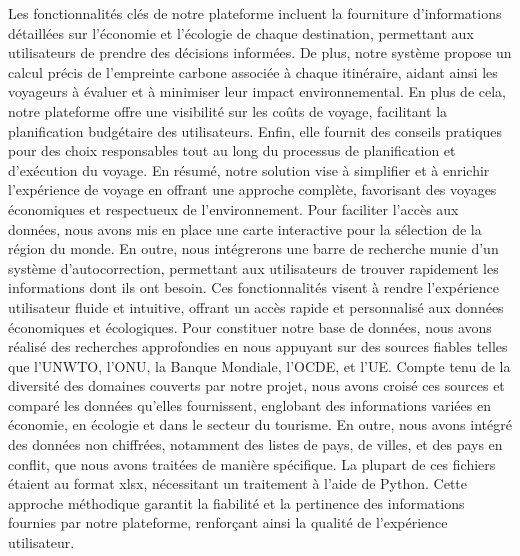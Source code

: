 \documentclass[mstat,12pt]{unswthesis}
\begin{document}
\begin{adjustwidth}{-2cm}{}
Les fonctionnalités clés de notre plateforme incluent la fourniture
d'informations détaillées sur l'économie et l'écologie de chaque
destination, permettant aux utilisateurs de prendre des décisions
informées. De plus, notre système propose un calcul précis de
l'empreinte carbone associée à chaque itinéraire, aidant ainsi les
voyageurs à évaluer et à minimiser leur impact environnemental. En plus
de cela, notre plateforme offre une visibilité sur les coûts de voyage,
facilitant la planification budgétaire des utilisateurs. Enfin, elle
fournit des conseils pratiques pour des choix responsables tout au long
du processus de planification et d'exécution du voyage. En résumé, notre
solution vise à simplifier et à enrichir l'expérience de voyage en
offrant une approche complète, favorisant des voyages économiques et
respectueux de l'environnement. Pour faciliter l'accès aux données, nous
avons mis en place une carte interactive pour la sélection de la région
du monde. En outre, nous intégrerons une barre de recherche munie d'un
système d'autocorrection, permettant aux utilisateurs de trouver
rapidement les informations dont ils ont besoin. Ces fonctionnalités
visent à rendre l'expérience utilisateur fluide et intuitive, offrant un
accès rapide et personnalisé aux données économiques et écologiques.
Pour constituer notre base de données, nous avons réalisé des recherches
approfondies en nous appuyant sur des sources fiables telles que
l'UNWTO, l'ONU, la Banque Mondiale, l'OCDE, et l'UE. Compte tenu de la
diversité des domaines couverts par notre projet, nous avons croisé ces
sources et comparé les données qu'elles fournissent, englobant des
informations variées en économie, en écologie et dans le secteur du
tourisme. En outre, nous avons intégré des données non chiffrées,
notamment des listes de pays, de villes, et des pays en conflit, que
nous avons traitées de manière spécifique. La plupart de ces fichiers
étaient au format xlsx, nécessitant un traitement à l'aide de Python.
Cette approche méthodique garantit la fiabilité et la pertinence des
informations fournies par notre plateforme, renforçant ainsi la qualité
de l'expérience utilisateur.


\end{adjustwidth}
\end{document}
